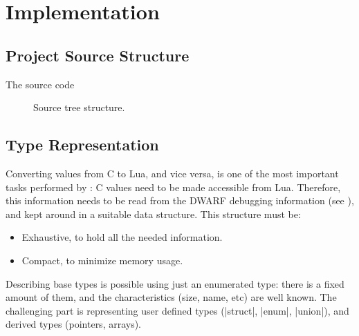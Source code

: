 
\chapter{Implementation}


\section{Project Source Structure}

The \Eol* source code

\begin{figure}[h]
    \centering
    \noindent\begin{minipage}{0.75\textwidth}
    \end{minipage}
    \caption{Source tree structure.}
\end{figure}



\section{Type Representation}

Converting values from C to Lua, and vice versa, is one of the most important
tasks performed by \Eol*: C values need to be made accessible from Lua.
Therefore, this information needs to be read from the DWARF debugging
information (see ), and kept around in
a suitable data structure. This structure must be:

\begin{itemize}
  \item Exhaustive, to hold all the needed information.
  \item Compact, to minimize memory usage.
\end{itemize}

Describing base types is possible using just an enumerated type: there is
a fixed amount of them, and the characteristics (size, name, etc) are well
known. The challenging part is representing user defined types (\Mc|struct|,
\Mc|enum|, \Mc|union|), and derived types (pointers, arrays).


